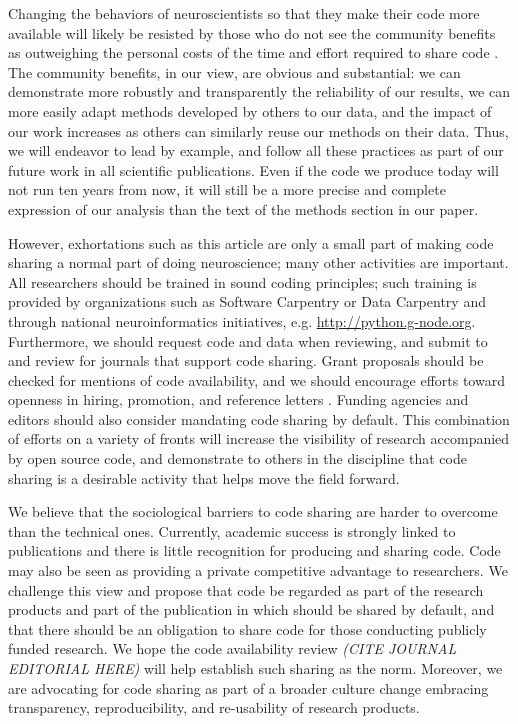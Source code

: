 \documentclass[11pt]{article}
\begin{document}
Changing the behaviors of neuroscientists so that they make their code more
available will likely be resisted by those who do not see the community
benefits as outweighing the personal costs of the time and effort required to
share code \cite{stodden2010scientific}. The community benefits, in our view,
are obvious and substantial: we can demonstrate more robustly and transparently
the reliability of our results, we can more easily adapt methods developed by
others to our data, and the impact of our work increases as others can
similarly reuse our methods on their data. Thus, we will endeavor to lead by
example, and follow all these practices as part of our future work in all
scientific publications. Even if the code we produce today will not run ten
years from now, it will still be a more precise and complete expression of our
analysis than the text of the methods section in our paper. 

However, exhortations such as this article are only a small part of
making code sharing a normal part of doing neuroscience; many other
activities are important.  All researchers should be trained in sound
coding principles; such training is provided by organizations such as
Software Carpentry \cite{wilson_best_2014} or Data Carpentry and
through national neuroinformatics initiatives,
e.g. \url{http://python.g-node.org}.  Furthermore, we should request
code and data when reviewing, and submit to and review for journals
that support code sharing.  Grant proposals should be checked for
mentions of code availability, and we should encourage efforts toward
openness in hiring, promotion, and reference letters
\cite{leveque2012reproducible}. Funding agencies and editors should
also consider mandating code sharing by default.  This combination of
efforts on a variety of fronts will increase the visibility of
research accompanied by open source code, and demonstrate to others in
the discipline that code sharing is a desirable activity that helps
move the field forward.

We believe that the sociological barriers to code sharing are harder
to overcome than the technical ones. Currently, academic success is
strongly linked to publications and there is little recognition for
producing and sharing code. Code may also be seen as providing a
private competitive advantage to researchers. We challenge this view
and propose that code be regarded as part of the research products and
part of the publication in which should be shared by default, and that
there should be an obligation to share code for those conducting
publicly funded research. We hope the code availability review
\textit{(CITE JOURNAL EDITORIAL HERE)} will
help establish such sharing as the norm.  Moreover, we are advocating
for code sharing as part of a broader culture change embracing
transparency, reproducibility, and re-usability of research products.
\end{document}
